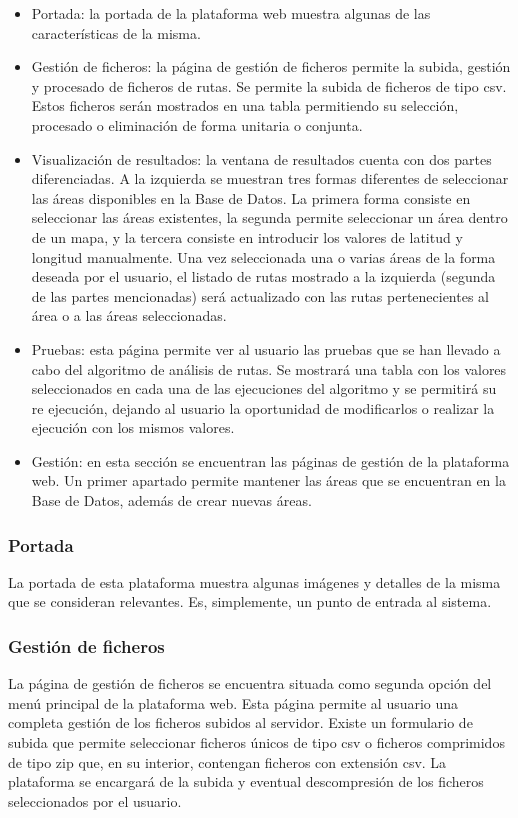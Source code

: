 \begin{itemize}
	\item Portada: la portada de la plataforma web muestra algunas de las características de la misma.
	\item Gestión de ficheros: la página de gestión de ficheros permite la subida, gestión y procesado de ficheros de rutas. Se permite la subida de ficheros de tipo csv. Estos ficheros serán mostrados en una tabla permitiendo su selección, procesado o eliminación de forma unitaria o conjunta.
	\item Visualización de resultados: la ventana de resultados cuenta con dos partes diferenciadas. A la izquierda se muestran tres formas diferentes de seleccionar las áreas disponibles en la Base de Datos. La primera forma consiste en seleccionar las áreas existentes, la segunda permite seleccionar un área dentro de un mapa, y la tercera consiste en introducir los valores de latitud y longitud manualmente. Una vez seleccionada una o varias áreas de la forma deseada por el usuario, el listado de rutas mostrado a la izquierda (segunda de las partes mencionadas) será actualizado con las rutas pertenecientes al área o a las áreas seleccionadas.
	\item Pruebas: esta página permite ver al usuario las pruebas que se han llevado a cabo del algoritmo de análisis de rutas. Se mostrará una tabla con los valores seleccionados en cada una de las ejecuciones del algoritmo y se permitirá su re ejecución, dejando al usuario la oportunidad de modificarlos o realizar la ejecución con los mismos valores.
	\item Gestión: en esta sección se encuentran las páginas de gestión de la plataforma web. Un primer apartado permite mantener las áreas que se encuentran en la Base de Datos, además de crear nuevas áreas.
\end{itemize}

\subsubsection{Portada}
La portada de esta plataforma muestra algunas imágenes y detalles de la misma que se consideran relevantes. Es, simplemente, un punto de entrada al sistema.

\subsubsection{Gestión de ficheros}
La página de gestión de ficheros se encuentra situada como segunda opción del menú principal de la plataforma web. Esta página permite al usuario una completa gestión de los ficheros subidos al servidor. Existe un formulario de subida que permite seleccionar ficheros únicos de tipo csv o ficheros comprimidos de tipo zip que, en su interior, contengan ficheros con extensión csv. La plataforma se encargará de la subida y eventual descompresión de los ficheros seleccionados por el usuario.


